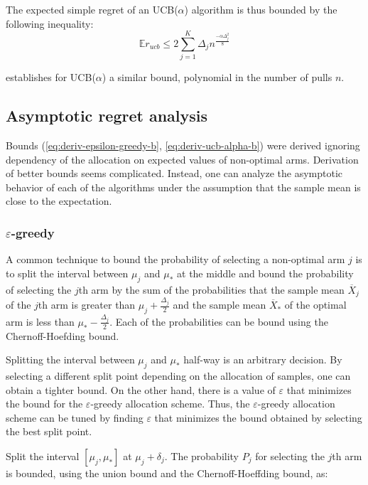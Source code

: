 \documentclass{article}
\newcommand {\IE} {\ensuremath {\mathbb{E}}}
\begin{document}
The expected simple regret of an UCB($\alpha$) algorithm is thus
bounded by the following inequality:
\begin{equation}
\IE r_{ucb} \le 2\sum_{j=1}^K \Delta_jn^{\frac {-\alpha \Delta_j^2} 8}
\label{eq:deriv-ucb-alpha-b}
\end{equation}

\cite{Bubeck.pure} establishes for UCB($\alpha$) a similar bound,
polynomial in the number of pulls $n$.

\subsection{Asymptotic regret analysis}
\label{app:derivations-asym}


Bounds (\ref{eq:deriv-epsilon-greedy-b}, \ref{eq:deriv-ucb-alpha-b}) were
derived ignoring dependency of the allocation on expected values
of non-optimal arms. Derivation of better bounds seems
complicated. Instead, one can analyze the asymptotic behavior of each of the
algorithms under the assumption that the sample mean is close to the expectation.

\subsubsection{$\varepsilon$-greedy}
\label{app:derivations-asym-eps}


A common technique \cite{Auer.ucb} to bound the probability of
selecting a non-optimal arm $j$ is to split the interval between
$\mu_j$ and $\mu_*$ at the middle and bound the probability of
selecting the $j$th arm by the sum of the probabilities that the sample
mean $\overline X_j$ of the $j$th arm is greater than $\mu_j+\frac
{\Delta_j} 2$ and the sample mean $\overline X_*$ of the optimal arm is
less than $\mu_*- \frac {\Delta_j} 2$. Each of the probabilities can
be bound using the Chernoff-Hoefding bound.

Splitting the interval between $\mu_j$ and $\mu_*$ half-way is an
arbitrary decision. By selecting a different split point
depending on the allocation of samples, one can obtain a tighter
bound. On the other hand, there is a value of $\varepsilon$ that
minimizes the bound for the $\varepsilon$-greedy allocation scheme.
Thus, the  $\varepsilon$-greedy allocation scheme can be tuned by
finding $\varepsilon$ that minimizes the bound obtained by
selecting the best split point. 

Split the interval $[\mu_j, \mu_*]$ at $\mu_j+\delta_j$. The
probability $P_j$ for selecting the
$j$th arm is bounded, using the union bound and the Chernoff-Hoeffding bound, as:
\end{document}

